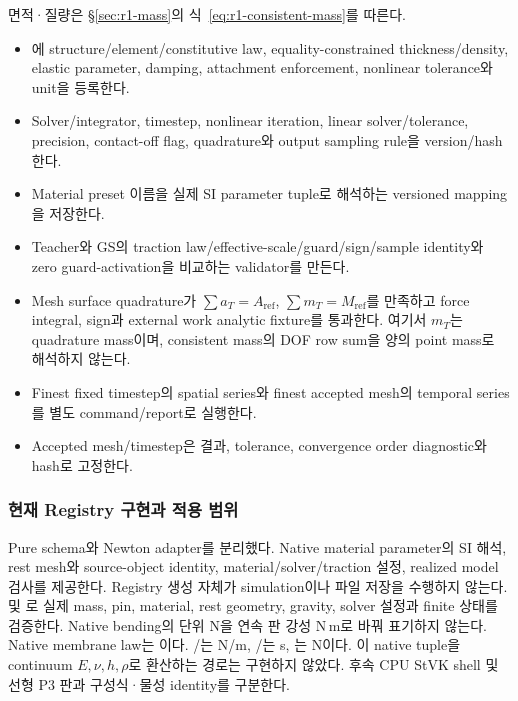 \documentclass[10pt]{article}
\begin{document}
면적·질량은 \S\ref{sec:r1-mass}의 식~\eqref{eq:r1-consistent-mass}를 따른다.

\begin{itemize}
  \item[$\square$] 에 structure/element/constitutive law, equality-constrained thickness/density,
  elastic parameter, damping, attachment enforcement, nonlinear tolerance와 unit을 등록한다.
  \item[$\square$] Solver/integrator, timestep, nonlinear iteration, linear solver/tolerance, precision, contact-off flag,
  quadrature와 output sampling rule을 version/hash한다.
  \item[$\square$] Material preset 이름을 실제 SI parameter tuple로 해석하는 versioned mapping을 저장한다.
  \item[$\square$] Teacher와 GS의 traction law/effective-scale/guard/sign/sample identity와
  zero guard-activation을 비교하는 validator를 만든다.
  \item[$\square$] Mesh surface quadrature가 \(\sum a_T=A_{\mathrm{ref}}\),
  \(\sum m_T=M_{\mathrm{ref}}\)를 만족하고 force integral, sign과 external work analytic fixture를 통과한다.
  여기서 \(m_T\)는 quadrature mass이며, consistent mass의 DOF row sum을 양의 point mass로 해석하지 않는다.
  \item[$\square$] Finest fixed timestep의 spatial series와 finest accepted mesh의 temporal series를 별도 command/report로 실행한다.
  \item[$\square$] Accepted mesh/timestep은 결과, tolerance, convergence order diagnostic와 hash로 고정한다.
\end{itemize}

\subsubsection{현재 Registry 구현과 적용 범위}

Pure schema와 Newton adapter를 분리했다. Native material parameter의 SI 해석, rest mesh와
source-object identity, material/solver/traction 설정, realized model 검사를 제공한다.
Registry 생성 자체가 simulation이나 파일 저장을 수행하지 않는다.
 및 로 실제 mass, pin,
material, rest geometry, gravity, solver 설정과 finite 상태를 검증한다.
Native bending의 단위 N을 연속 판 강성 N\,m로 바꿔 표기하지 않는다.
Native membrane law는 이다.
/는 N/m, /는 s,
는 N이다. 이 native tuple을 continuum \(E,\nu,h,\rho\)로 환산하는 경로는 구현하지 않았다.
후속 CPU StVK shell 및 선형 P3 판과 구성식·물성 identity를 구분한다.
\end{document}
